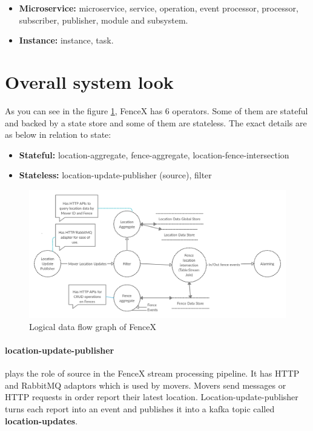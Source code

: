 \documentclass[a4]{report}
\begin{document}
    \begin{itemize}
        \item  \textbf{Microservice:} microservice, service, operation, event processor, processor, subscriber,
        publisher, module and subsystem.
        \item \textbf{Instance:} instance, task.
    \end{itemize}


    \section{Overall system look}
    As you can see in the figure \ref{fig:logical-dfg}, FenceX has 6 operators.
    Some of them are stateful and backed by a state store and some of them are stateless.
    The exact details are as below in relation to state:

    \begin{itemize}
        \item \textbf{Stateful:} location-aggregate, fence-aggregate, location-fence-intersection
        \item \textbf{Stateless:} location-update-publisher (source), filter
    \end{itemize}

    \begin{figure}[ht]
        \caption{Logical data flow graph of FenceX}
        \label{fig:logical-dfg}
        \includegraphics[scale=0.2]{images/logical-data-flow-diagram.png}
    \end{figure}

    \paragraph{location-update-publisher} plays the role of source in the FenceX stream processing pipeline.
    It has HTTP and RabbitMQ adaptors which is used by movers.
    Movers send messages or HTTP requests in order report their latest location.
    Location-update-publisher turns each report into an event and publishes it into a kafka topic called
    \textbf{location-updates}.
\end{document}

